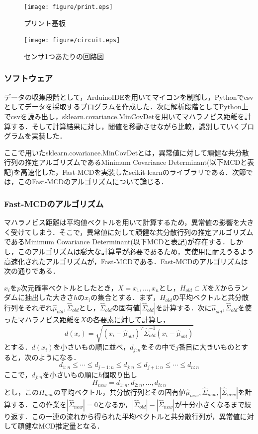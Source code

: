 \documentclass[Japanese]{dicomopapers}
\begin{document}
\begin{figure}[!t]
  \begin{center}
    \texttt{[image: figure/print.eps]}
  \end{center}
  \caption{プリント基板}
  \label{print}
\end{figure}

\begin{figure}[!t]
  \begin{center}
    \texttt{[image: figure/circuit.eps]}
  \end{center}
  \caption{センサ1つあたりの回路図}
  \label{circuit}
\end{figure}

\subsubsection{ソフトウェア}
データの収集段階として，ArduinoIDEを用いてマイコンを制御し，Pythonでcsvとしてデータを採取するプログラムを作成した．次に解析段階としてPython上でcsvを読み出し，sklearn.covariance.MinCovDetを用いてマハラノビス距離を計算する．そして計算結果に対し，閾値を移動させながら比較，識別していくプログラムを実装した．\par
ここで用いたsklearn.covariance.MinCovDetとは，異常値に対して頑健な共分散行列の推定アルゴリズムであるMinimum Covariance Determinant(以下MCDと表記)を高速化した，Fast-MCDを実装したscikit-learnのライブラリである．次節では，このFast-MCDのアルゴリズムについて論じる．

\subsubsection{Fast-MCDのアルゴリズム}
マハラノビス距離は平均値ベクトルを用いて計算するため，異常値の影響を大きく受けてしまう．そこで，異常値に対して頑健な共分散行列の推定アルゴリズムであるMinimum Covariance Determinant(以下MCDと表記)が存在する．しかし，このアルゴリズムは膨大な計算量が必要であるため，実使用に耐えうるよう高速化されたアルゴリズムが，Fast-MCDである．Fast-MCDのアルゴリズムは次の通りである．\par
$x_i$を$p$次元確率ベクトルとしたとき，$X = {x_1, \ldots, x_n}$とし，$H_{old}\subset X$を$X$からランダムに抽出した大きさ$h$の$x_i$の集合とする．まず，$H_{old}$の平均ベクトルと共分散行列をそれぞれ$\hat{\mu}_{old}, \hat{\Sigma}_{old}$とし，$\hat{\Sigma}_{old}$の固有値$|\hat{\Sigma}_{old}|$を計算する．次に$\hat{\mu}_{old}, \hat{\Sigma}_{old}$を使ったマハラノビス距離を$X$の各要素に対して計算し，
\[
d(x_i) = \sqrt{(x_i-\hat{\mu}_{old})^{T}\hat{\Sigma}_{old}^{-1}(x_i-\hat{\mu}_{old})}
\]
とする．$d(x_i)$を小さいもの順に並べ，$d_{j:n}$をその中で$j$番目に大きいものとすると，次のようになる．
\[
d_{1:n}\leq \cdots\leq d_{j-1:n}\leq d_{j:n}\leq d_{j+1:n}\leq \cdots\leq d_{n:n}
\]
ここで，$d_{j:n}$を小さいもの順に$h$個取り出し
\[
H_{new} = {d_{1:n}, d_{2:n}, \ldots, d_{h:n}}
\]
とし，この$H_{new}$の平均ベクトル，共分散行列とその固有値$\hat{\mu}_{new}, \hat{\Sigma}_{new}, |\hat{\Sigma}_{new}|$を計算する．この作業を$|\hat{\Sigma}_{new}|=0$となるか，$|\hat{\Sigma}_{old}|-|\hat{\Sigma}_{new}|$が十分小さくなるまで繰り返す．この一連の流れから得られた平均ベクトルと共分散行列が，異常値に対して頑健なMCD推定量となる．
\end{document}
